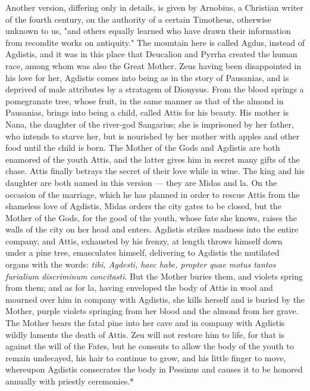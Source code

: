 \documentclass[a4paper, 11pt, oneside, polutonikogreek, english]{article}
\begin{document}
Another version, differing only in details, is given by Arnobius, a Christian writer of the fourth century, on the authority of a certain Timotheus, otherwise unknown to us, "and others equally learned who have drawn their information from recondite works on antiquity." The mountain here is called Agdus, instead of Agdistis, and it was in this place that Deucalion and Pyrrha created the human race, among whom was also the Great Mother. Zeus having been disappointed in his love for her, Agdistis comes into being as in the story of Pausanias, and is deprived of male attributes by a stratagem of Dionysus. From the blood springs a pomegranate tree, whose fruit, in the same manner as that of the almond in Pausanias, brings into being a child, called Attis for his beauty. His mother is Nana, the daughter of the river-god Sangarius; she is imprisoned by her father, who intends to starve her, but is nourished by her mother with apples and other food until the child is born. The Mother of the Gods and Agdistis are both enamored of the youth Attis, and the latter gives him in secret many gifts of the chase. Attis finally betrays the secret of their love while in wine. The king and his daughter are both named in this version --- they are Midas and la. On the occasion of the marriage, which he has planned in order to rescue Attis from the shameless love of Agdistis, Midas orders the city gates to be closed, but the Mother of the Gods, for the good of the youth, whose fate she knows, raises the walls of the city on her head and enters. Agdistis strikes madness into the entire company, and Attis, exhausted by his frenzy, at length throws himself down under a pine tree, emasculates himself, delivering to Agdistis the mutilated organs with the words: \emph{tibi, Agdesti, haec habe, propter quae motus tantos furialium discriminum concitasti}. But the Mother buries them, and violets spring from them; and as for la, having enveloped the body of Attis in wool and mourned over him in company with Agdistis, she kills herself and is buried by the Mother, purple violets springing from her blood and the almond from her grave. The Mother bears the fatal pine into her cave and in company with Agdistis wildly laments the death of Attis. Zeu will not restore him to life, for that is against the will of the Fates, but he consents to allow the body of the youth to remain undecayed, his hair to continue to grow, and his little finger to move, whereupon Agdistis consecrates the body in Pessinus and causes it to be honored annually with priestly ceremonies.*
\end{document}
